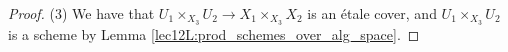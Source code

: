 \begin{proof}

   (3) We have that $U_1\times_{X_3}U_2 \to X_1\times_{X_3} X_2$ is an \'etale cover, and
   $U_1\times_{X_3} U_2$ is a scheme by Lemma \ref{lec12L:prod_schemes_over_alg_space}.
 \end{proof}

